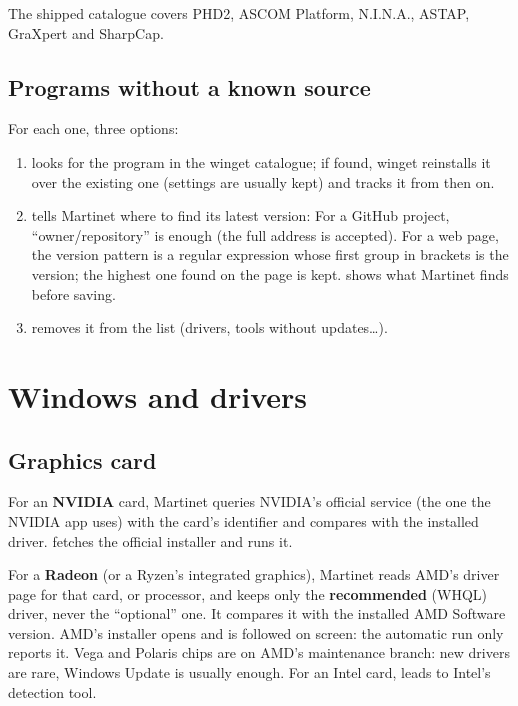 The shipped catalogue covers PHD2, ASCOM Platform, N.I.N.A., ASTAP, GraXpert and SharpCap.

\subsection{Programs without a known source}

For each one, three options:
\begin{enumerate}
\item {} looks for the program in the winget catalogue; if found, winget
reinstalls it over the existing one (settings are usually kept) and tracks it from then on.
\item {} tells Martinet where to find its latest version:
For a GitHub project, “owner/repository” is enough (the full address is accepted). For a web page,
the version pattern is a regular expression whose first group in brackets is the version; the highest
one found on the page is kept.  shows what Martinet finds before saving.
\item {} removes it from the list (drivers, tools without updates…).
\end{enumerate}


\section{Windows and drivers}\label{sec:windows}


\subsection{Graphics card}

For an \textbf{NVIDIA} card, Martinet queries NVIDIA's official service (the one the NVIDIA app uses)
with the card's identifier and compares with the installed driver.  fetches the official installer and runs it.

For a \textbf{Radeon} (or a Ryzen's integrated graphics), Martinet reads AMD's driver page for that
card, or processor, and keeps only the \textbf{recommended} (WHQL) driver, never the “optional” one.
It compares it with the installed AMD Software version. AMD's installer opens and is followed on
screen: the automatic run only reports it. Vega and Polaris chips are on AMD's maintenance branch:
new drivers are rare, Windows Update is usually enough. For an Intel card,  leads
to Intel's detection tool.

